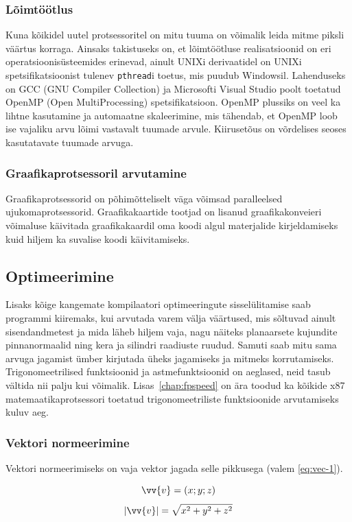 \documentclass[a4paper,12pt]{report}
\renewcommand{\vec}[1]{\vv{#1}}
\begin{document}
\subsubsection{Lõimtöötlus}
Kuna kõikidel uutel protsessoritel on mitu tuuma on võimalik leida mitme
piksli väärtus korraga. Ainsaks takistuseks on, et lõimtöötluse realisatsioonid
on eri operatsiooni\-süstee\-mides erinevad, ainult UNIXi derivaatidel on
UNIXi spetsifikatsioonist tulenev \texttt{pthread}i toetus, mis puudub
Windowsil. Lahenduseks on GCC (GNU Compiler Collection) ja Microsofti
Visual Studio poolt toetatud OpenMP (Open MultiProcessing) spetsifikatsioon.
OpenMP plussiks on veel ka lihtne kasutamine ja automaatne skaleerimine,
mis tähendab, et OpenMP loob ise vajaliku arvu lõimi vastavalt tuumade
arvule. Kiirusetõus on võrdelises seoses kasutatavate tuumade arvuga.

\subsubsection{Graafikaprotsessoril arvutamine}
Graafikaprotsessorid on põhimõtteliselt väga võimsad paralleelsed
ujukomaprotsessorid. Graafikakaartide tootjad on lisanud graafikakonveieri
võimaluse käivitada graafikakaardil oma koodi algul materjalide kirjeldamiseks
kuid hiljem ka suvalise koodi käivitamiseks.

\subsection{Optimeerimine}
Lisaks kõige kangemate kompilaatori optimeeringute sisselülitamise saab
programmi kii\-re\-maks, kui arvutada varem välja väärtused, mis sõltuvad
ainult sisendandmetest ja mida läheb hiljem vaja, nagu näiteks planaarsete
kujundite pinnanormaalid ning kera ja si\-lind\-ri raadiuste ruudud. Samuti
saab mitu sama arvuga jagamist ümber kirjutada üheks jagamiseks ja mitmeks
korrutamiseks. Trigonomeetrilised funktsioonid ja astmefunktsioonid on
aeglased, neid tasub vältida nii palju kui võimalik. Lisas~\ref{chap:fpspeed}
on ära toodud ka kõikide x87 matemaatikaprotsessori toetatud trigonomeetriliste
funktsioonide arvutamiseks kuluv aeg.

\subsubsection{Vektori normeerimine}
Vektori normeerimiseks on vaja vektor jagada selle pikkusega (valem \ref{eq:vec-1}).

\[\vec v = (x; y; z)\]
\begin{equation} \label{eq:vec-1}
|\vec v| = \sqrt{x^2 + y^2 + z^2}
\end{equation}
\end{document}
